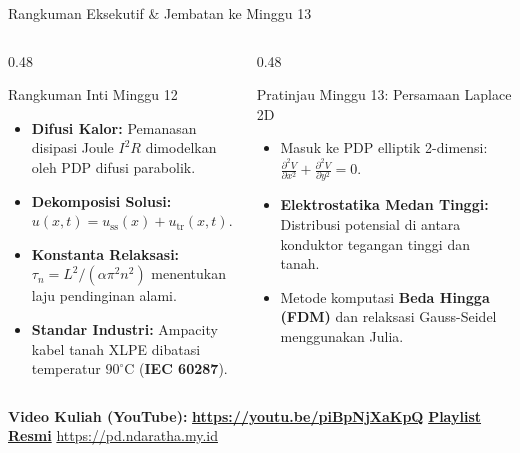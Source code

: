 \documentclass[aspectratio=169,10pt]{beamer}
\begin{document}
\begin{frame}{Rangkuman Eksekutif \& Jembatan ke Minggu 13}
  \begin{columns}[t]
    \begin{column}{0.48\textwidth}
      \begin{block}{Rangkuman Inti Minggu 12}
        \begin{itemize}
          \item \textbf{Difusi Kalor:} Pemanasan disipasi Joule $I^2 R$ dimodelkan oleh PDP difusi parabolik.
          \item \textbf{Dekomposisi Solusi:} $u(x, t) = u_{\text{ss}}(x) + u_{\text{tr}}(x, t)$.
          \item \textbf{Konstanta Relaksasi:} $\tau_n = L^2 / (\alpha \pi^2 n^2)$ menentukan laju pendinginan alami.
          \item \textbf{Standar Industri:} Ampacity kabel tanah XLPE dibatasi temperatur $90^\circ\text{C}$ (\textbf{IEC 60287}).
        \end{itemize}
      \end{block}
    \end{column}
    \begin{column}{0.48\textwidth}
      \begin{alertblock}{Pratinjau Minggu 13: Persamaan Laplace 2D}
        \begin{itemize}
          \item Masuk ke PDP elliptik 2-dimensi: $\frac{\partial^2 V}{\partial x^2} + \frac{\partial^2 V}{\partial y^2} = 0$.
          \item \textbf{Elektrostatika Medan Tinggi:} Distribusi potensial di antara konduktor tegangan tinggi dan tanah.
          \item Metode komputasi \textbf{Beda Hingga (FDM)} dan relaksasi Gauss-Seidel menggunakan Julia.
        \end{itemize}
      \end{alertblock}
    \end{column}
  \end{columns}
  \vspace{0.06cm}
  \begin{center}
    \scriptsize \textbf{Video Kuliah (YouTube):} {\color{red!80!black}\textbf{\url{https://youtu.be/piBpNjXaKpQ}}} \quad \textbar \quad \href{https://www.youtube.com/playlist?list=PLS5oOZWXZeTw}{\color{unibblue}\textbf{Playlist Resmi}} \quad \textbar \quad \url{https://pd.ndaratha.my.id}
  \end{center}
\end{frame}
\end{document}
